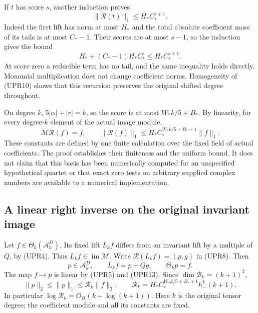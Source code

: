 \documentclass[11pt,a4paper]{article}
\begin{document}
If \(t\) has score \(s\), another induction proves
\[
\|\mathcal R(t)\|_1\le H_*C_*^{s+1}.
\tag{UPR15}
\]
Indeed the first lift has norm at most \(H_*\) and the total
absolute coefficient mass of its tails is at most \(C_*-1\).
Their scores are at most \(s-1\), so the induction gives the bound
\[
H_*+(C_*-1)H_*C_*^s\le H_*C_*^{s+1}.
\]
At score zero a reducible term has no tail, and the same inequality
holds directly.  Monomial multiplication does not change coefficient
norms.  Homogeneity of (UPR10) shows that this recursion preserves
the original shifted degree throughout.

On degree \(k\), \(5|\alpha|+|r|=k\), so the score is at most
\(W_*k/5+B_*\).  By linearity, for every degree-\(k\) element of
the actual image module,
\[
\mathcal M\mathcal R(f)=f,\qquad
\|\mathcal R(f)\|_1
\le H_*C_*^{W_*k/5+B_*+1}\|f\|_1.
\tag{UPR16}
\]
These constants are defined by one finite calculation over the
fixed field of actual coefficients.  The proof establishes their
finiteness and the uniform bound.  It does not claim that this
basis has been numerically computed for an unspecified hypothetical
quartet or that exact zero tests on arbitrary supplied complex
numbers are available to a numerical implementation.

\subsection{A linear right inverse on the original invariant image}
Let \(f\in\Theta_k(\mathcal A_k^D)\).  Its fixed lift \(L_kf\)
differs from an invariant lift by a multiple of \(Q\), by (UPR4).
Thus \(L_kf\in\operatorname{im}\mathcal M\).
Write \(\mathcal R(L_kf)=(p,g)\) in (UPR8).  Then
\[
p\in\mathcal A_k^D,\qquad L_kf=p+Qg,\qquad \Theta_kp=f.
\]
The map \(f\mapsto p\) is linear by (UPR5) and (UPR13).
Since \(\dim\mathcal B_k=(k+1)^2\),
\[
\|p\|_2\le\|p\|_1
\le\mathscr R_k\|f\|_2,\qquad
\mathscr R_k=
H_*C_*^{W_*k/5+B_*+1}h_-^k(k+1).
\tag{UPR17}
\]
In particular \(\log\mathscr R_k=O_{H}(k+\log(k+1))\).
Here \(k\) is the original tensor degree; the coefficient module
and all its constants are fixed.
\end{document}
